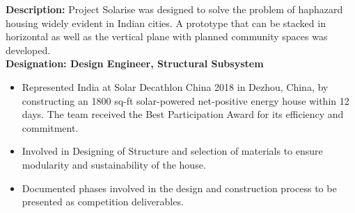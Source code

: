 \begin{itemize}
{        \textbf{Description:}{ Project Solarise was designed to solve the problem of haphazard housing widely evident in Indian cities. A prototype that can be stacked in horizontal as well as the vertical plane with planned community spaces was developed.}\vspace{1mm}\\
        \textbf{Designation: Design Engineer, Structural Subsystem}
        \begin{itemize}
            \setlength\itemsep{0.7mm}
            \item Represented India at Solar Decathlon China 2018 in Dezhou, China, by constructing an 1800 sq-ft solar-powered net-positive energy house within 12 days. The team received the Best Participation Award for its efficiency and commitment.
            \item Involved in Designing of Structure and selection of materials to ensure modularity and sustainability of the house.
            \item Documented phases involved in the design and construction process to be presented as competition deliverables.
        \end{itemize}}   
\end{itemize}{}


